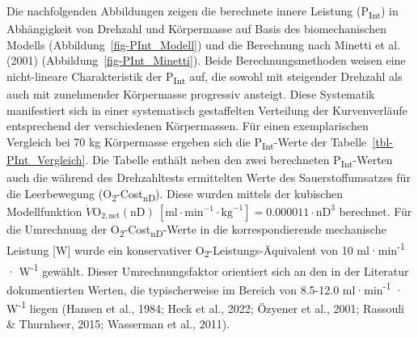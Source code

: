 \documentclass[
  letterpaper,
  DIV=11]{scrartcl}
\begin{document}
Die nachfolgenden Abbildungen zeigen die berechnete innere Leistung
(P\textsubscript{Int}) in Abhängigkeit von Drehzahl und Körpermasse auf
Basis des biomechanischen Modells (Abbildung~\ref{fig-PInt_Modell}) und
die Berechnung nach Minetti et al. (2001)
(Abbildung~\ref{fig-PInt_Minetti}). Beide Berechnungsmethoden weisen
eine nicht-lineare Charakteristik der P\textsubscript{Int} auf, die
sowohl mit steigender Drehzahl als auch mit zunehmender Körpermasse
progressiv ansteigt. Diese Systematik manifestiert sich in einer
systematisch gestaffelten Verteilung der Kurvenverläufe entsprechend der
verschiedenen Körpermassen. Für einen exemplarischen Vergleich bei 70 kg
Körpermasse ergeben sich die P\textsubscript{Int}-Werte der
Tabelle~\ref{tbl-PInt_Vergleich}. Die Tabelle enthält neben den zwei
berechneten P\textsubscript{Int}-Werten auch die während des
Drehzahltests ermittelten Werte des Sauerstoffumsatzes für die
Leerbewegung (O\textsubscript{2}-Cost\textsubscript{nD}). Diese wurden
mittels der kubischen Modellfunktion
\(\dot{V}\mathrm{O}_{2,\text{net}}(\text{nD}) \ [\text{ml} \cdot \text{min}^{-1} \cdot \text{kg}^{-1}] = 0.000011 \cdot \text{nD}^3\)
berechnet. Für die Umrechnung der
O\textsubscript{2}-Cost\textsubscript{nD}-Werte in die korrespondierende
mechanische Leistung {[}W{]} wurde ein konservativer
O\textsubscript{2}-Leistungs-Äquivalent von 10
ml·min\textsuperscript{-1} · W\textsuperscript{-1} gewählt. Dieser
Umrechnungsfaktor orientiert sich an den in der Literatur dokumentierten
Werten, die typischerweise im Bereich von 8.5-12.0
ml·min\textsuperscript{-1} · W\textsuperscript{-1} liegen (Hansen et
al., 1984; Heck et al., 2022; Özyener et al., 2001; Rassouli \&
Thurnheer, 2015; Wasserman et al., 2011).
\end{document}
